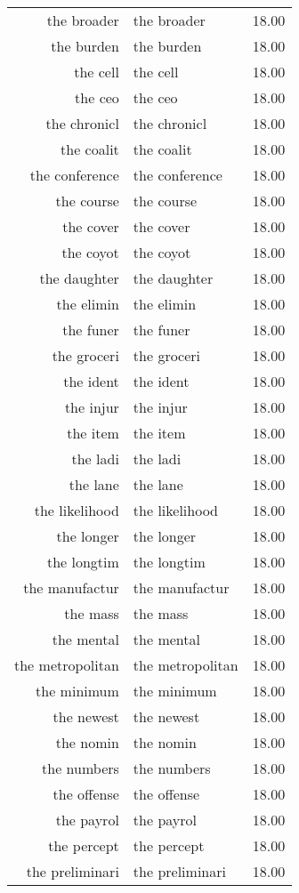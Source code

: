 \begin{table}[ht]
\begin{tabular}{rlr}
  the broader & the broader & 18.00 \\ 
  the burden & the burden & 18.00 \\ 
  the cell & the cell & 18.00 \\ 
  the ceo & the ceo & 18.00 \\ 
  the chronicl & the chronicl & 18.00 \\ 
  the coalit & the coalit & 18.00 \\ 
  the conference & the conference & 18.00 \\ 
  the course & the course & 18.00 \\ 
  the cover & the cover & 18.00 \\ 
  the coyot & the coyot & 18.00 \\ 
  the daughter & the daughter & 18.00 \\ 
  the elimin & the elimin & 18.00 \\ 
  the funer & the funer & 18.00 \\ 
  the groceri & the groceri & 18.00 \\ 
  the ident & the ident & 18.00 \\ 
  the injur & the injur & 18.00 \\ 
  the item & the item & 18.00 \\ 
  the ladi & the ladi & 18.00 \\ 
  the lane & the lane & 18.00 \\ 
  the likelihood & the likelihood & 18.00 \\ 
  the longer & the longer & 18.00 \\ 
  the longtim & the longtim & 18.00 \\ 
  the manufactur & the manufactur & 18.00 \\ 
  the mass & the mass & 18.00 \\ 
  the mental & the mental & 18.00 \\ 
  the metropolitan & the metropolitan & 18.00 \\ 
  the minimum & the minimum & 18.00 \\ 
  the newest & the newest & 18.00 \\ 
  the nomin & the nomin & 18.00 \\ 
  the numbers & the numbers & 18.00 \\ 
  the offense & the offense & 18.00 \\ 
  the payrol & the payrol & 18.00 \\ 
  the percept & the percept & 18.00 \\ 
  the preliminari & the preliminari & 18.00 \\ 

\end{tabular}
\end{table}
